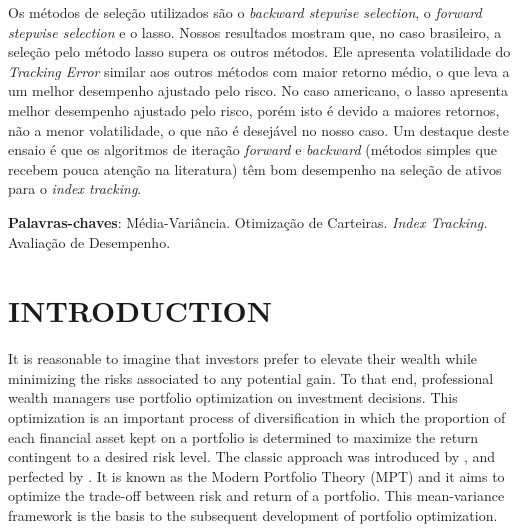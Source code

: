 \documentclass[12pt,oneside,a4paper]{memoir}
\begin{document}
Os métodos de seleção utilizados são o \textit{backward stepwise selection}, o \textit{forward stepwise selection} e o lasso.
Nossos resultados mostram que, no caso brasileiro, a seleção pelo método lasso supera os outros métodos.
Ele apresenta volatilidade do \textit{Tracking Error} similar aos outros métodos com maior retorno médio, o que leva a um melhor desempenho ajustado pelo risco.
No caso americano, o lasso apresenta melhor desempenho ajustado pelo risco, porém isto é devido a maiores retornos, não a menor volatilidade, o que não é desejável no nosso caso.
Um destaque deste ensaio é que os algoritmos de iteração \textit{forward} e \textit{backward} (métodos simples que recebem pouca atenção na literatura) têm bom desempenho na seleção de ativos para o \textit{index tracking}.

\noindent 
\textbf{Palavras-chaves}: Média-Variância. Otimização de Carteiras. \textit{Index Tracking.} Avaliação de Desempenho.


\cleardoublepage
\listoffigures*

\vspace{2em}


\cleardoublepage
\listoftables*


\cleardoublepage
\tableofcontents*
\cleardoublepage

\textual

\setcounter{page}{10} 

\chapter{INTRODUCTION}

It is reasonable to imagine that investors prefer to elevate their wealth while minimizing the risks associated to any potential gain.
To that end, professional wealth managers use portfolio optimization on investment decisions.
This optimization is an important process of diversification in which the proportion of each financial asset kept on a portfolio is determined to maximize the return contingent to a desired risk level.
The classic approach was introduced by , and perfected by .
It is known as the Modern Portfolio Theory (MPT) and it aims to optimize the trade-off between risk and return of a portfolio.
This mean-variance framework is the basis to the subsequent development of portfolio optimization.
\end{document}
